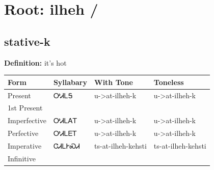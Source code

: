 \documentclass{article}%
\begin{document}
%
\normalsize%
\section*{Root: ilheh / }%
\subsection*{stative-k}%
\textbf{Definition: }%
it’s hot%
\\[0.5em]%
\begin{tabular}{|l|l|l|l|}%
\hline%
\textbf{Form}&\textbf{Syllabary}&\textbf{With Tone}&\textbf{Toneless}\\%
\hline%
Present&ᎤᏗᏞᎦ&u{-}>at{-}ilheh{-}k&u{-}>at{-}ilheh{-}k\\%
1st Present&&&\\%
Imperfective&ᎤᏗᏞᎪᎢ&u{-}>at{-}ilheh{-}k&u{-}>at{-}ilheh{-}k\\%
Perfective&ᎤᏗᏞᎬᎢ&u{-}>at{-}ilheh{-}k&u{-}>at{-}ilheh{-}k\\%
Imperative&ᏣᏗᏞᎨᏍᏗ&ts{-}at{-}ilheh{-}kehsti&ts{-}at{-}ilheh{-}kehsti\\%
Infinitive&&&\\%
\hline%
\end{tabular}%
\\[1em]%
\end{document}
